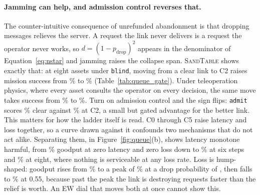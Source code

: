 \documentclass[11pt]{article}
\newcommand{\sandtable}{\textsc{SandTable}}
\begin{document}
\paragraph{Jamming can help, and admission control reverses that.} The counter-intuitive consequence of unrefunded abandonment is that dropping messages relieves the server. A request the link never delivers is a request the operator never works, so $d = (1-p_{\text{drop}})^2$ appears in the denominator of Equation~\ref{eq:nstar} and jamming raises the collapse span. \sandtable{} shows exactly that: at eight assets under \texttt{blind}, moving from a clear link to C2 raises mission success from \qBlindClear\% to \qBlindJammed\% (Table~\ref{tab:queue_gate}). Under teleoperation physics, where every asset consults the operator on every decision, the same move takes success from \qTeleBlindClear\% to \qTeleBlindJam\%. Turn on admission control and the sign flips: \texttt{admit} scores \qAdmitClear\% clear against \qAdmitJammed\% at C2, a small but gated advantage for the better link. This matters for how the ladder itself is read. C0 through C5 raise latency and loss together, so a curve drawn against it confounds two mechanisms that do not act alike. Separating them, in Figure~\ref{fig:queue}(b), shows latency monotone harmful, from \qDecoupClean\% goodput at zero latency and zero loss down to \qDecoupLatSix\% at six steps and \qDecoupLatEight\% at eight, where nothing is serviceable at any loss rate. Loss is hump-shaped: goodput rises from \qDecoupClean\% to a peak of \qDecoupPeak\% at a drop probability of \qDecoupPeakDrop{}, then falls to \qDecoupHiLoss\% at 0.55, because past the peak the link is destroying requests faster than the relief is worth. An EW dial that moves both at once cannot show this.
\end{document}
